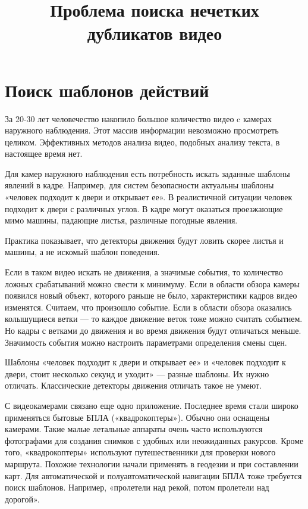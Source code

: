 \documentclass{.local/lib/classes/ndvr-super-article-standalone}
\title[NDVR thesis-abstract]{%
    Проблема поиска нечетких дубликатов видео%
}
\begin{document}
    \pagebreak

    \section{Поиск шаблонов действий}

    За 20-30 лет человечество накопило большое 
    количество видео c камерах наружного наблюдения.
    Этот массив информации невозможно просмотреть целиком.
    Эффективных методов анализа видео, 
    подобных анализу текста, в настоящее время нет. 

    Для камер наружного наблюдения есть потребность искать 
    заданные шаблоны явлений в кадре. 
    Например, для систем безопасности актуальны шаблоны 
    «человек подходит к двери и открывает ее». 
    В реалистичной ситуации человек подходит 
    к двери с различных углов. 
    В кадре могут оказаться проезжающие мимо машины, 
    падающие листья, различные погодные явления.

    Практика показывает, что детекторы движения 
    будут ловить скорее листья и машины, 
    а не искомый шаблон поведения.

    Если в таком видео искать не движения, 
    а значимые события, то количество ложных срабатываний 
    можно свести к минимуму. Если в области обзора камеры 
    появился новый объект, которого раньше не было, 
    характеристики кадров видео изменятся. 
    Считаем, что произошло событие. 
    Если в области обзора оказались колышущиеся ветки 
    — то каждое движение веток тоже можно считать событием. 
    Но кадры с ветками до движения и во время движения 
    будут отличаться меньше. 
    Значимость события можно настроить 
    параметрами определения смены сцен. 

    Шаблоны «человек подходит к двери и открывает ее» 
    и «человек подходит к двери, стоит несколько секунд и уходит» 
    — разные шаблоны. Их нужно отличать. 
    Классические детекторы движения отличать такое не умеют.

    С видеокамерами связано еще одно приложение. 
    Последнее время стали широко применяться 
    бытовые БПЛА («квадрокоптеры»). Обычно они оснащены камерами. 
    Такие малые летальные аппараты очень часто используются
    фотографами для создания снимков с удобных или неожиданных ракурсов. 
    Кроме того, «квадрокоптеры» используют путешественники 
    для проверки нового маршрута. 
    Похожие технологии начали применять 
    в геодезии и при составлении карт. 
    Для автоматической и полуавтоматической навигации 
    БПЛА тоже требуется поиск шаблонов. 
    Например, «пролетели над рекой, потом пролетели над дорогой». 
\end{document}
